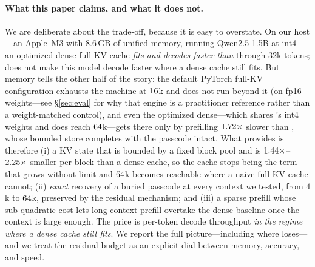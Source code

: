\paragraph{What this paper claims, and what it does not.}
We are deliberate about the trade-off, because it is easy to overstate. On our host---an
Apple~M3 with $8.6$\,GB of unified memory, running Qwen2.5-1.5B at int4---an optimized dense full-KV
cache \emph{fits and decodes faster than} \dkv{} through $32$k tokens; \dkv{} does not make
this model decode faster where a dense cache still fits. But memory tells the other half of the
story: the default PyTorch full-KV configuration exhausts the machine at $16$k and does not run
beyond it (on fp16 weights---see \S\ref{sec:eval} for why that engine is a practitioner reference
rather than a weight-matched control), and even the optimized dense---which shares \dkv{}'s int4
weights and does reach $64$k---gets there only by prefilling $1.72\times$ slower
than \dkv{}, whose bounded store completes with the passcode intact.
What \dkv{} provides is therefore (i) a KV state that is bounded by a fixed block pool and is
$1.44\times$--$2.25\times$ smaller per block than a dense cache, so the cache
stops being the term that grows without limit and $64$k becomes reachable where a naive
full-KV cache cannot; (ii) \emph{exact} recovery of a buried passcode at every context we tested, from $4$k to
$64$k, preserved by the residual mechanism; and (iii) a sparse prefill whose sub-quadratic
cost lets long-context prefill overtake the dense baseline once the context is large enough. The
price is per-token decode throughput \emph{in the regime where a dense cache still fits}. We
report the full picture---including where \dkv{} loses---and we treat the residual budget
\maxres{} as an explicit dial between memory, accuracy, and speed.

